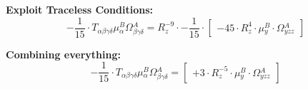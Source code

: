 \documentclass{article}
\begin{document}
\textbf{Exploit Traceless Conditions:}
\begin{equation}
- \frac{1}{15} \cdot T_{\alpha{}\beta{}\gamma{}\delta{}} \mu{}^{B}_{\alpha{}} \Omega{}^{A}_{\beta{}\gamma{}\delta{}} = R_{z}^{-9} \cdot - \frac{1}{15} \cdot  \left[ \begin{array}{c} 
 		- 45 \cdot R_{z}^{4} \cdot \mu{}^{B}_{y} \cdot \Omega{}^{A}_{yzz}
 \end{array}\right] 
\end{equation}


\textbf{Combining everything:}
\begin{equation}
- \frac{1}{15} \cdot T_{\alpha{}\beta{}\gamma{}\delta{}} \mu{}^{B}_{\alpha{}} \Omega{}^{A}_{\beta{}\gamma{}\delta{}} =  \left[ \begin{array}{c} 
 		+ 3 \cdot R_{z}^{-5} \cdot \mu{}^{B}_{y} \cdot \Omega{}^{A}_{yzz}
 \end{array}\right] 
\end{equation}
\end{document}

